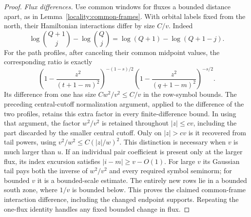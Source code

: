 \begin{proof}
\emph{Flux differences.}
Use common windows for fluxes a bounded distance apart, as in
Lemma~\ref{locality:common-frames}.  With orbital labels fixed from the
north, their Hamiltonian interactions differ by size $C/v$.  Indeed
\[
 \log\binom{Q+1}{j}-\log\binom Qj
     =\log(Q+1)-\log(Q+1-j).
\]
For the path profiles, after canceling their common midpoint values,
the corresponding ratio is exactly
\[
 \left(1-\frac{z^2}{(t+1-m)^2}\right)^{-(1-s)/2}
 \left(1-\frac{z^2}{(q+1-m)^2}\right)^{-s/2}.
\]
Its difference from one has size $Cw^2/v^2\le C/v$ in the row-symbol
bounds.  The preceding central-cutoff normalization
argument, applied to the difference of the two profiles, retains this
extra factor in every finite-difference bound.  In using that argument,
the factor $w^2/v^2$ is retained throughout $|z|\le cv$, including the
part discarded by the smaller central cutoff.  Only on $|z|>cv$ is it
recovered from tail powers, using
$v^2/w^2\le C(|z|/w)^2$.  This distinction is necessary when $v$ is
much larger than $u$.  If an individual pair
coefficient is present only at the larger flux, its index excursion
satisfies $|i-m|\ge v-O(1)$.  For large $v$ its Gaussian tail pays both
the inverse of $w^2/v^2$ and every required symbol seminorm; for bounded
$v$ it is a bounded-scale estimate.  The entirely new rows lie in a
bounded south zone, where $1/v$ is bounded below.  This proves the
claimed common-frame interaction difference, including the changed
endpoint supports.  Repeating the one-flux identity handles any fixed
bounded change in flux.


\end{proof}
